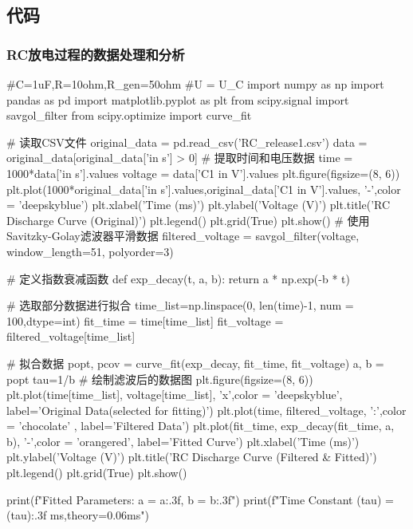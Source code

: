 \documentclass[UTF8]{ctexart}
\begin{document}
\subsection{代码}
\subsubsection{RC放电过程的数据处理和分析}
\begin{python}
#C=1uF,R=10ohm,R_gen=50ohm
#U = U_C
import numpy as np
import pandas as pd
import matplotlib.pyplot as plt
from scipy.signal import savgol_filter
from scipy.optimize import curve_fit

# 读取CSV文件
original_data = pd.read_csv('RC_release1.csv')  
data = original_data[original_data['in s'] > 0]
# 提取时间和电压数据
time = 1000*data['in s'].values
voltage = data['C1 in V'].values
plt.figure(figsize=(8, 6))
plt.plot(1000*original_data['in s'].values,original_data['C1 in V'].values, '-',color = 'deepskyblue')
plt.xlabel('Time (ms)')
plt.ylabel('Voltage (V)')
plt.title('RC Discharge Curve (Original)')
plt.legend()
plt.grid(True)
plt.show()
# 使用Savitzky-Golay滤波器平滑数据
filtered_voltage = savgol_filter(voltage, window_length=51, polyorder=3)



# 定义指数衰减函数
def exp_decay(t, a, b):
    return a * np.exp(-b * t)

# 选取部分数据进行拟合
time_list=np.linspace(0, len(time)-1, num = 100,dtype=int)
fit_time = time[time_list]
fit_voltage = filtered_voltage[time_list]

# 拟合数据
popt, pcov = curve_fit(exp_decay, fit_time, fit_voltage)
a, b = popt
tau=1/b
# 绘制滤波后的数据图
plt.figure(figsize=(8, 6))
plt.plot(time[time_list], voltage[time_list], 'x',color = 'deepskyblue', label='Original Data(selected for fitting)')
plt.plot(time, filtered_voltage, ':',color = 'chocolate' , label='Filtered Data')
plt.plot(fit_time, exp_decay(fit_time, a, b), '-',color = 'orangered', label='Fitted Curve')
plt.xlabel('Time (ms)')
plt.ylabel('Voltage (V)')
plt.title('RC Discharge Curve (Filtered & Fitted)')
plt.legend()
plt.grid(True)
plt.show()

print(f"Fitted Parameters: a = {a:.3f}, b = {b:.3f}")
print(f"Time Constant (tau) = {(tau):.3f} ms,theory=0.06ms")



\end{python}
\end{document}
